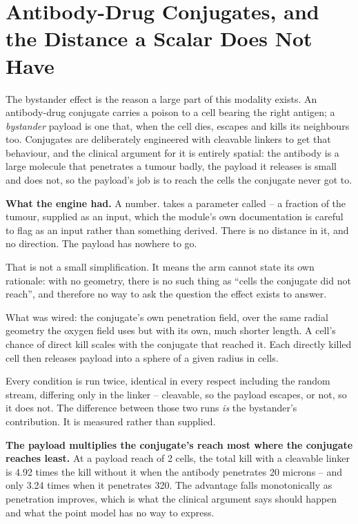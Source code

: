 \documentclass[11pt,twoside,openright]{report}
\begin{document}
\section{Antibody-Drug Conjugates, and the Distance a Scalar Does Not Have}

The bystander effect is the reason a large part of this modality exists. An antibody-drug conjugate carries a poison to a cell bearing the right antigen; a \textit{bystander} payload is one that, when the cell dies, escapes and kills its neighbours too. Conjugates are deliberately engineered with cleavable linkers to get that behaviour, and the clinical argument for it is entirely spatial: the antibody is a large molecule that penetrates a tumour badly, the payload it releases is small and does not, so the payload's job is to reach the cells the conjugate never got to.

\textbf{What the engine had.} A number.  takes a parameter called  -- a fraction of the tumour, supplied as an input, which the module's own documentation is careful to flag as an input rather than something derived. There is no distance in it, and no direction. The payload has nowhere to go.

That is not a small simplification. It means the arm cannot state its own rationale: with no geometry, there is no such thing as ``cells the conjugate did not reach'', and therefore no way to ask the question the effect exists to answer.

\begin{numbers}
What was wired: the conjugate's own penetration field,  over the same radial geometry the oxygen field uses but with its own, much shorter length. A cell's chance of direct kill scales with the conjugate that reached it. Each directly killed cell then releases payload into a sphere of a given radius in cells.

Every condition is run twice, identical in every respect including the random stream, differing only in the linker -- cleavable, so the payload escapes, or not, so it does not. The difference between those two runs \textit{is} the bystander's contribution. It is measured rather than supplied.
\end{numbers}

\begin{finding}
\textbf{The payload multiplies the conjugate's reach most where the conjugate reaches least.} At a payload reach of 2 cells, the total kill with a cleavable linker is 4.92 times the kill without it when the antibody penetrates 20 microns -- and only 3.24 times when it penetrates 320. The advantage falls monotonically as penetration improves, which is what the clinical argument says should happen and what the point model has no way to express.
\end{finding}
\end{document}
